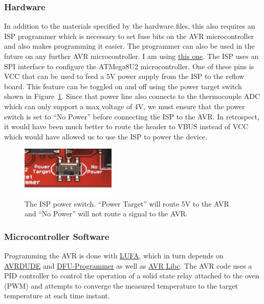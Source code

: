 \documentclass[11pt,twoside,a4paper]{report}
\begin{document}
\subsubsection{Hardware}
In addition to the materials specified by the hardware files, this also requires an ISP programmer
which is necessary to set fuse bits on the AVR microcontroller and also makes programming it
easier. The programmer can also be used in the future on any further AVR microcontroller. I am using
\href{https://www.sparkfun.com/products/9825}{this one}. The ISP uses an SPI interface to configure
the ATMega8U2 microcontroller. One of these pins is VCC that can be used to feed a 5V power supply
from the ISP to the reflow board. This feature can be toggled on and off using the power target
switch shown in Figure~\ref{fig:isp-power-switch}. Since that power line also connects to the
thermocouple ADC which can only support a max voltage of 4V, we must ensure that the power switch is
set to ``No Power'' before connecting the ISP to the AVR. In retrospect, it would have been much
better to route the header to VBUS instead of VCC which would have allowed us to use the ISP to
power the device.

\begin{figure}[h]
  \centering
  \includegraphics[width=0.4\textwidth]{data/isp-power-switch.jpg}
  \caption{The ISP power switch. ``Power Target'' will route 5V to the AVR and ``No Power'' will not
    route a signal to the AVR.}
  \label{fig:isp-power-switch}
\end{figure}

\subsubsection{Microcontroller Software}
Programming the AVR is done with \href{http://www.fourwalledcubicle.com/LUFA.php}{LUFA}, which in
turn depends on \href{https://www.nongnu.org/avrdude/}{AVRDUDE} and
\href{https://dfu-programmer.github.io/}{DFU-Programmer} as well as
\href{https://www.microchip.com/webdoc/AVRLibcReferenceManual/index.html}{AVR Libc}. The AVR code
uses a PID controller to control the operation of a solid state relay attached to the oven (PWM) and
attempts to converge the measured temperature to the target temperature at each time instant.
\end{document}
